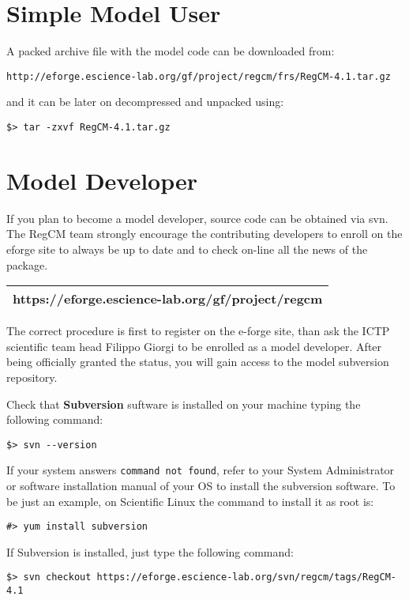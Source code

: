 %
%

\section{Simple Model User}

A packed archive file with the model code can be downloaded from:

\begin{Verbatim}
http://eforge.escience-lab.org/gf/project/regcm/frs/RegCM-4.1.tar.gz
\end{Verbatim}

and it can be later on decompressed and unpacked using:

\begin{Verbatim}
$> tar -zxvf RegCM-4.1.tar.gz
\end{Verbatim}

\section{Model Developer}

If you plan to become a model developer, source code can be obtained via svn.
The RegCM team strongly encourage the contributing developers to enroll on
the eforge site to always be up to date and to check on-line all the news of
the package.

\vspace{0.5cm}
\begin{tabular}{|c|}
\hline
{\bf https://eforge.escience-lab.org/gf/project/regcm} \\
\hline
\end{tabular}
\vspace{0.5cm}

The correct procedure is first to register on the e-forge site, than ask
the ICTP scientific team head Filippo Giorgi to be enrolled as a model
developer. After being officially granted the status, you will gain
access to the model subversion repository.

Check that {\bf Subversion} suftware is installed on your machine typing
the following command:

\begin{verbatim}
$> svn --version
\end{verbatim}

If your system answers \verb=command not found=, refer to your System
Administrator or software installation manual of your OS to install the
subversion software. To be just an example, on Scientific Linux the command
to install it as root is:

\begin{verbatim}
#> yum install subversion
\end{verbatim}

If Subversion is installed, just type the following command:

\begin{verbatim}
$> svn checkout https://eforge.escience-lab.org/svn/regcm/tags/RegCM-4.1
\end{verbatim}

